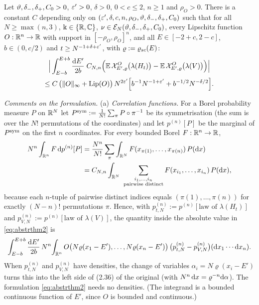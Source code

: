 \begin{theorem}\label{thm:23}
Let $\vartheta,\delta_-,\delta_+,C_0>0$, $\varepsilon'>0$, $\delta>0$, $0<c\le2$, $n\ge1$ and $\rho_O>0$.
There is a constant $C$ depending only on $(\varepsilon',\delta,c,n,\rho_O,\vartheta,\delta_-,\delta_+,C_0)$ such that for all $N\ge\max(n,3)$,
$\Bbbk\in\{\mathbb{R},\mathbb{C}\}$, $\nu\in\mathcal E_N(\vartheta,\delta_-,\delta_+,C_0)$, every Lipschitz function $O:\mathbb{R}^n\to\mathbb{R}$ with support in $[-\rho_O,\rho_O]^n$, and all
$E\in[-2+c,2-c]$, $b\in(0,c/2)$ and $t\ge N^{-1+\delta+\varepsilon'}$, with $\varrho:=\varrho_{sc}(E)$:
\begin{multline}\label{eq:abstrthm2}
 \Big|\int_{E-b}^{E+b}\frac{\mathrm{d} E'}{2b}\;C_{N,n}\Big(\mathbb{E}\,\mathcal X^{O}_{E',\varrho}\big(\lambda(H_t)\big)-\mathbb{E}\,\mathcal X^{O}_{E',\varrho}\big(\lambda(V)\big)\Big)\Big|\\
 \le C\,\big(\|O\|_\infty+\operatorname{Lip}(O)\big)\,N^{2\varepsilon'}\Big[b^{-1}N^{-1+\varepsilon'}+b^{-1/2}N^{-\delta/2}\Big].
\end{multline}
\end{theorem}
\noindent\emph{Comments on the formulation.}
(a) \emph{Correlation functions.} For a Borel probability measure $P$ on $\mathbb{R}^N$ let $P^{\rm sym}:=\frac1{N!}\sum_{\pi}P\circ\pi^{-1}$ be its symmetrisation (the sum is over the
$N!$ permutations of the coordinates) and let $p^{(n)}[P]$ be the marginal of $P^{\rm sym}$ on the first $n$ coordinates. For every bounded Borel $F:\mathbb{R}^n\to\mathbb{R}$,
\begin{align*}
 N^n\int_{\mathbb{R}^n}F\,\mathrm{d} p^{(n)}[P]&=\frac{N^n}{N!}\sum_\pi\int_{\mathbb{R}^N}F(x_{\pi(1)},\dots,x_{\pi(n)})\,P(\mathrm{d} x)\\
 &=C_{N,n}\int_{\mathbb{R}^N}\ \sum_{\substack{i_1,\dots,i_n\\ \text{pairwise distinct}}}F(x_{i_1},\dots,x_{i_n})\,P(\mathrm{d} x),
\end{align*}
because each $n$-tuple of pairwise distinct indices equals $(\pi(1),\dots,\pi(n))$ for exactly $(N-n)!$ permutations $\pi$. Hence, with
$p^{(n)}_{t,N}:=p^{(n)}[\text{law of }\lambda(H_t)]$ and $p^{(n)}_{V,N}:=p^{(n)}[\text{law of }\lambda(V)]$, the quantity inside the absolute value in \eqref{eq:abstrthm2} is
\[
 \int_{E-b}^{E+b}\frac{\mathrm{d} E'}{2b}\,N^n\!\int_{\mathbb{R}^n}O\big(N\varrho(x_1-E'),\dots,N\varrho(x_n-E')\big)\,\big(p^{(n)}_{t,N}-p^{(n)}_{V,N}\big)(\mathrm{d} x_1\cdots\mathrm{d} x_n).
\]
When $p^{(n)}_{t,N}$ and $p^{(n)}_{V,N}$ have densities, the change of variables $\alpha_i=N\varrho(x_i-E')$ turns this into the left side of (2.36) of the original
(with $N^n\,\mathrm{d} x=\varrho^{-n}\mathrm{d}\alpha$). The formulation \eqref{eq:abstrthm2} needs no densities. (The integrand is a bounded continuous function of $E'$, since $O$ is bounded and continuous.)

